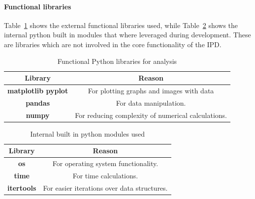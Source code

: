 \paragraph{Functional libraries}
Table~\ref{table:functionalLibrares} shows the external functional libraries used, while Table~\ref{table:builtinmodules} shows the internal python built in modules that where leveraged during development.
These are libraries which are not involved in the core functionality of the IPD\@.
\begin{table}[ht]
    \centering
    \begin{tabular}{cc}
        \toprule
        Library & Reason\\
        \midrule
        \textbf{matplotlib pyplot} & For plotting graphs and images with data\\
        \textbf{pandas} & For data manipulation.\\
        \textbf{numpy} & For reducing complexity of numerical calculations.\\
        \bottomrule
    \end{tabular}
    \caption{Functional Python libraries for analysis}\label{table:functionalLibrares}
\end{table}
\begin{table}[ht]
    \centering
    \begin{tabular}{cc}
        \toprule
        Library & Reason\\
        \midrule
        \textbf{os} & For operating system functionality.\\
        \textbf{time} & For time calculations.\\
        \textbf{itertools} & For easier iterations over data structures.\\
        \bottomrule
    \end{tabular}
    \caption{Internal built in python modules used}\label{table:builtinmodules}
\end{table}
